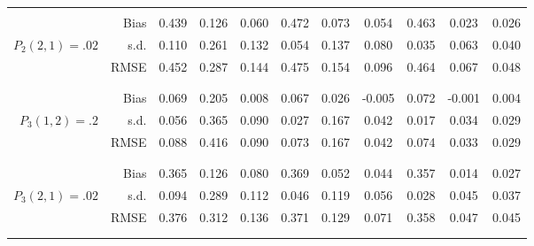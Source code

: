 \begin{tabular}{rr@{\hskip .3in}ccc@{\hskip .4in}ccc@{\hskip .4in}ccc}
\\\\&Bias & 0.439&0.126&0.060&0.472&0.073&0.054&0.463&0.023&0.026 \\
$ P_{2}(2,1)=.02 $& s.d. & 0.110&0.261&0.132&0.054&0.137&0.080&0.035&0.063&0.040 \\
&RMSE & 0.452&0.287&0.144&0.475&0.154&0.096&0.464&0.067&0.048 \\
\\\\&Bias & 0.069&0.205&0.008&0.067&0.026&-0.005&0.072&-0.001&0.004 \\
$ P_{3}(1,2)=.2 $& s.d. & 0.056&0.365&0.090&0.027&0.167&0.042&0.017&0.034&0.029 \\
&RMSE & 0.088&0.416&0.090&0.073&0.167&0.042&0.074&0.033&0.029 \\
\\\\&Bias & 0.365&0.126&0.080&0.369&0.052&0.044&0.357&0.014&0.027 \\
$ P_{3}(2,1)=.02 $& s.d. & 0.094&0.289&0.112&0.046&0.119&0.056&0.028&0.045&0.037 \\
&RMSE & 0.376&0.312&0.136&0.371&0.129&0.071&0.358&0.047&0.045 \\
\\\\\end{tabular}